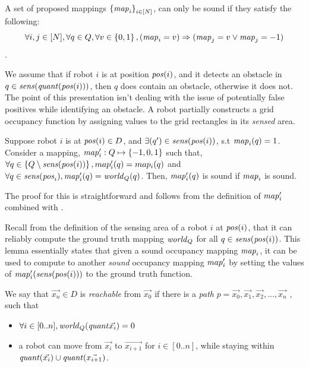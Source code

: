 A set of proposed mappings $\left\{\mathit{map}_i\right\}_{i\in [N]}$, can only be sound if they satisfy the following: $$\forall i,j \in [N],\forall q\in Q, \forall v \in \left\{0,1\right\}, (\mathit{map}_i = v) \Rightarrow (\mathit{map}_j = v \vee \mathit{map}_j = -1)$$.

We assume that if robot $i$ is at position $\mathit{pos}(i)$, and it detects an obstacle in $q \in \mathit{sens}(\mathit{quant}(\mathit{pos}(i)))$, then $q$ does contain an obstacle, otherwise it does not. The point of this presentation isn't dealing with the issue of potentially false positives while identifying an obstacle. A robot partially constructs a grid occupancy function by assigning values to the grid rectangles in its \emph{sensed} area.

\begin{lemma}
    \label{lem:extension}
    Suppose robot $i$ is at $\mathit{pos}(i)\in D$, and $\exists(q^\prime)\in \mathit{sens}(\mathit{pos}(i))$,
    s.t $\mathit{map}_i(q) = 1$. Consider a mapping, $\mathit{map}^\prime_i:Q \mapsto \left\{-1,0,1\right\}$
    such that, $\forall q\in \left\{Q \setminus \mathit{sens}(\mathit{pos}(i))\right\}, map^\prime_i(q) = map_i(q)$
    and $\forall q \in \mathit{sens}(\mathit{pos}_i), \mathit{map}^\prime_i(q) = \mathit{world}_Q(q)$.
    Then, $\mathit{map}^\prime_i(q)$ is sound if $\mathit{map}_i$ is sound.
\end{lemma}

The proof for this is straightforward and follows from the definition of $\mathit{map}^\prime_i$ combined with .

Recall from the definition of the sensing area of a robot $i$ at $\mathit{pos}(i)$, that it can reliably compute the ground truth mapping $\mathit{world}_Q$ for all $q \in \mathit{sens}(\mathit{pos}(i))$. This lemma essentially states that given a sound occupancy mapping $\mathit{map}_i$, it can be used to compute to another \emph{sound} occupancy mapping $\mathit{map}^\prime_i$ by setting the values of $\mathit{map}^\prime_i(\mathit{sens}(\mathit{pos}(i)))$ to the ground truth function.

\begin{definition}
 We say that $\Vec{x_n}\in D$ is \emph{reachable} from $\Vec{x_0}$ if there is a \emph{path} $p = \Vec{x_0},\Vec{x_1}, \Vec{x_2},\ldots, \Vec{x_n}$ , such that
\begin{itemize}
\item $\forall i \in [0..n],\mathit{world}_Q(\mathit{quant}{\Vec{x_i}}) = 0$
\item a robot can move from $\Vec{x_i}$ to $\Vec{x_{i+1}}$ for $i \in [0..n]$, while staying within $\mathit{quant}(\Vec{x_i}) \cup \mathit{quant}(\Vec{x_{i+1}})$.
\end{itemize}
\end{definition}

